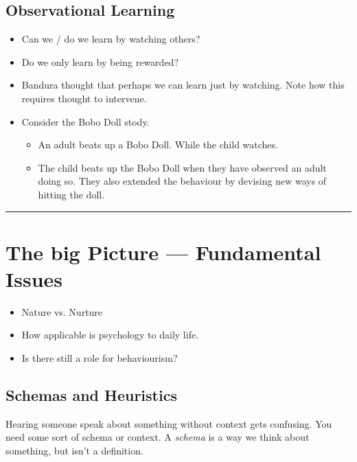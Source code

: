 \documentclass[12pt]{article}
\begin{document}
\subsection{Observational Learning}

\begin{itemize}
	\item Can we / do we learn by watching others?
	\item Do we only learn by being rewarded?
	\item Bandura thought that perhaps we can learn just by watching. Note how
		this requires thought to intervene.
	\item Consider the Bobo Doll stody.
		\begin{itemize}
			\item An adult beats up a Bobo Doll. While the child watches.
			\item The child beats up the Bobo Doll when they have observed an
				adult doing so. They also extended the behaviour by devising new
				ways of hitting the doll.
		\end{itemize}
\end{itemize}

\vspace{1cm}
\hrule

\section{The big Picture --- Fundamental Issues}

\begin{itemize}
	\item Nature vs. Nurture
	\item How applicable is psychology to daily life.
	\item Is there still a role for behaviourism?
\end{itemize}

\subsection{Schemas and Heuristics}

Hearing someone speak about something without context gets confusing. You need
some sort of schema or context. A \emph{schema} is a way we think about
something, but isn't a definition.
\end{document}
